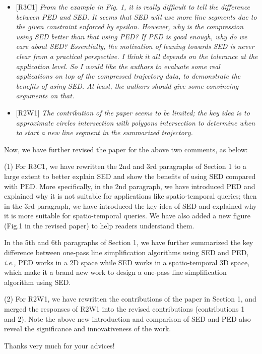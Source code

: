 \documentclass{letter}
\newcommand{\ie}{\emph{i.e.,}\xspace}
\begin{document}
\begin{itemize}
  \item {{[R3C1]} \emph{From the example in Fig. 1, it is really difficult to tell the difference between PED and SED. It seems that SED will use more line segments due to the given constraint enforced by epsilon. However, why is the compression using SED better than that using PED? If PED is good enough, why do we care about SED? Essentially, the motivation of leaning towards SED is never clear from a practical perspective. I think it all depends on the tolerance at the application level. So I would like the authors to evaluate some real applications on top of the compressed trajectory data, to demonstrate the benefits of using SED. At least, the authors should give some convincing arguments on that.}}
  \item {{[R2W1]} \emph{The contribution of the paper seems to be limited; the key idea is to approximate circles intersection with polygons intersection to determine when to start a new line segment in the summarized trajectory.}}
\end{itemize}

Now, we have further revised the paper for the above two comments, as below:

(1) For R3C1, we have rewritten the 2nd and 3rd paragraphs of Section 1 to a large extent to better explain SED and show the benefits of using SED compared with PED.
More specifically, in the 2nd paragraph, we have introduced PED and explained why it is not suitable for applications like spatio-temporal queries; then in the 3rd paragraph, we have introduced the key idea of SED and explained why it is more suitable for spatio-temporal queries.
We have also added a new figure (Fig.1 in the revised paper) to help readers understand them.

In the 5th and 6th paragraphs of Section 1, we have further summarized the key difference between one-pass line simplification algorithms using SED and PED, \ie PED works in a 2D space while SED works in a spatio-temporal 3D space, which make it a brand new work to design a one-pass line simplification algorithm using SED.

(2) For R2W1, we have rewritten the contributions of the paper in Section 1, and merged the responses of {R2W1} into the revised contributions (contributions 1 and 2). Note the above new introduction and comparison of SED and PED also reveal the significance and innovativeness of the work.

Thanks very much for your advices!
\end{document}
